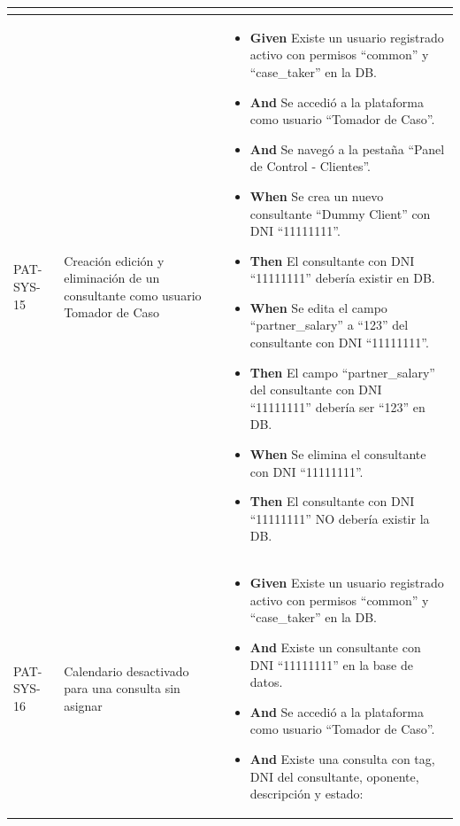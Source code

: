 \begin{longtable}{|p{1cm}|p{2.5cm}|p{12cm}|}
\begin{itemize}
    \end{itemize}
    \\
    \hline
    PAT-SYS-15 & Creación edición y eliminación de un consultante como usuario Tomador de Caso & 
    \begin{itemize}
        \item \textbf{Given} Existe un usuario registrado activo con permisos ``common'' y ``case\_taker'' en la DB.
        \item \textbf{And} Se accedió a la plataforma como usuario ``Tomador de Caso''.
        \item \textbf{And} Se navegó a la pestaña ``Panel de Control - Clientes''.
        \newline
        \item \textbf{When}  Se crea un nuevo consultante ``Dummy Client'' con DNI ``11111111''.
        \newline
        \item \textbf{Then} El consultante con DNI ``11111111'' deber\'ia existir en DB.
        \newline
        \item \textbf{When} Se edita el campo ``partner\_salary'' a ``123'' del consultante con DNI ``11111111''.
        \newline
        \item \textbf{Then} El campo ``partner\_salary'' del consultante con DNI ``11111111'' deber\'ia ser ``123'' en DB.
        \newline
        \item \textbf{When} Se elimina el consultante con DNI ``11111111''.
        \newline
        \item \textbf{Then} El consultante con DNI ``11111111'' NO deber\'ia existir la DB.
    \end{itemize}
    \\
     \hline
    PAT-SYS-16 & Calendario desactivado para una consulta sin asignar & 
    \begin{itemize}
        \item \textbf{Given} Existe un usuario registrado activo con permisos ``common'' y ``case\_taker'' en la DB.
        \item \textbf{And} Existe un consultante con DNI ``11111111'' en la base de datos.
        \item \textbf{And} Se accedió a la plataforma como usuario ``Tomador de Caso''.
        \item \textbf{And} Existe una consulta con tag, DNI del consultante, oponente, descripción y estado:

\end{itemize}
\end{longtable}
